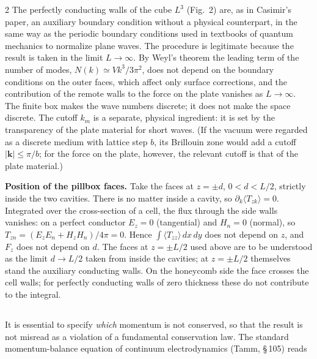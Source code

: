 \documentclass[twoside, 10pt]{article}
\def\myvspacebeforesubsection{-2.0mm}
\def\myvspaceaftersubsection{-2.5mm}
\begin{document}
\begin{multicols}{2}
The perfectly conducting walls of the cube $L^3$ (Fig.~2) are, as in Casimir's
paper, an auxiliary boundary condition without a physical counterpart, in the same
way as the periodic boundary conditions used in textbooks of quantum mechanics to
normalize plane waves. The procedure is legitimate because the result is taken in
the limit $L\to\infty$. By Weyl's theorem \cite{Weyl1912} the leading term of the
number of modes, $N(k)\simeq Vk^3/3\pi^2$, does not depend on the boundary
conditions on the outer faces, which affect only surface corrections, and the
contribution of the remote walls to the force on the plate vanishes as
$L\to\infty$. The finite box makes the wave numbers discrete; it does not make the
space discrete. The cutoff $k_m$ is a separate, physical ingredient: it is set by
the transparency of the plate material for short waves. (If the vacuum were
regarded as a discrete medium with lattice step $b$, its Brillouin zone would add a
cutoff $|\mathbf{k}|\le\pi/b$; for the force on the plate, however, the relevant
cutoff is that of the plate material.)

\textbf{Position of the pillbox faces.} Take the faces at $z=\pm d$,
$0<d<L/2$, strictly inside the two cavities. There is no matter inside a cavity,
so $\partial_k\langle T_{zk}\rangle=0$. Integrated over the cross-section of a
cell, the flux through the side walls vanishes: on a perfect conductor $E_z=0$
(tangential) and $H_n=0$ (normal), so $T_{zn}=(E_zE_n+H_zH_n)/4\pi=0$. Hence
$\int\langle T_{zz}\rangle\,dx\,dy$ does not depend on $z$, and $F_z$ does not
depend on $d$. The faces at $z=\pm L/2$ used above are to be understood as the
limit $d\to L/2$ taken from inside the cavities; at $z=\pm L/2$ themselves stand
the auxiliary conducting walls. On the honeycomb side the face crosses the cell
walls; for perfectly conducting walls of zero thickness these do not contribute to
the integral.

\vspace{\myvspacebeforesubsection}
\subsection*{}
\vspace{\myvspaceaftersubsection}

It is essential to specify \emph{which} momentum is not conserved, so that the
result is not misread as a violation of a fundamental conservation law. The
standard momentum-balance equation of continuum electrodynamics (Tamm,
\S\,105) reads
\end{multicols}
\end{document}
